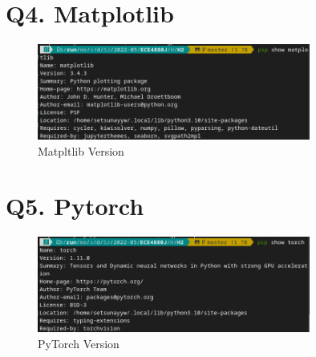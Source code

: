 \documentclass{article}
\begin{document}
\section*{Q4. Matplotlib}

\begin{figure}[!hbtp]
	\centering
	\includegraphics[width=0.8\textwidth]{img/matpl-version.png}
	\caption{\label{fig:matpl-version}Matpltlib Version}
\end{figure}

\section*{Q5. Pytorch}

\begin{figure}[!hbtp]
	\centering
	\includegraphics[width=0.8\textwidth]{img/torch-version.png}
	\caption{\label{fig:torch-version}PyTorch Version}
\end{figure}
\end{document}
